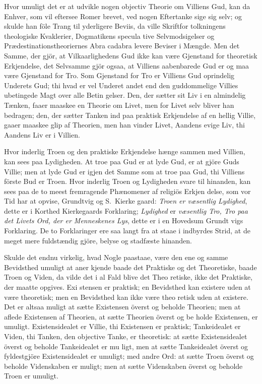 \documentclass[12pt,a4paper]{article}
\newcommand{\opage}[1]{\marginnote{\footnotesize\textit{[#1]}}}
\begin{document}
Hvor umuligt det er at udvikle nogen objectiv Theorie
om Villiens Gud, kan da Enhver, som vil eftersee Romer\-%
brevet, ved nogen Eftertanke sige sig selv; og skulde
han föle Trang til yderligere Beviis, da ville Skriftfor\-%
tolkningens theologiske Kvaklerier, Dogmatikens specula\-%
tive Selvmodsigelser og Prædestinationstheoriernes Abra\-%
cadabra levere Beviser i Mængde. Men det Samme, der
gjör, at Vilkaarlighedens Gud ikke kan være Gjenstand for
theoretisk Erkjendelse, det Selvsamme gjör ogsaa, at
Villiens aabenbarede Gud er og maa være Gjenstand for
Tro. Som Gjenstand for Tro er Villiens Gud oprindelig
Underets Gud; thi hvad er vel Underet andet end den
guddommelige Villies ubetingede Magt over alle Betin\-%
gelser. Den, der sætter sit Liv i en almindelig Tænken,
faaer maaskee en Theorie om Livet, men for Livet selv
bliver han bedragen; den, der sætter Tanken ind paa
praktisk Erkjendelse af en hellig Villie, gaaer maaskee
glip af Theorien, men han vinder Livet, Aandens evige
Liv, thi Aandens Liv er i Villien.

Hvor inderlig Troen og den praktiske Erkjendelse
hænge sammen med Villien, kan sees paa Lydigheden.
At troe paa Gud er at lyde Gud, er at gjöre Guds Villie;
men at lyde Gud er igjen det Samme som at troe paa
Gud, thi Villiens förste Bud er Troen. Hvor inderlig
Troen og Lydigheden svare til hinanden, kan sees paa
de to meest fremragende Phænomener af religiös Erkjen\-%
delse, som vor Tid har at opvise, Grundtvig og S.\ Kierke\-%
\opage{76}gaard: \emph{Troen er væsentlig Lydighed}, dette er
i Korthed Kierkegaards Forklaring; \emph{Lydighed} er
\emph{væsentlig Tro, Tro paa det Livets Ord, der er
Menneskenes Lys}, dette er i en Hovedsum Grundt\-%
vigs Forklaring. De to Forklaringer ere saa langt fra
at staae i indbyrdes Strid, at de meget mere fuldstændig\-%
gjöre, belyse og stadfæste hinanden.

Skulde det endnu virkelig, hvad Nogle paastaae,
være den ene og samme Bevidsthed umuligt at aner\-%
kjende baade det Praktiske og det Theoretiske, baade
Troen og Viden, da vilde det i al Fald blive det Theo\-%
retiske, ikke det Praktiske, der maatte opgives. Exi\-%
stensen er praktisk; en Bevidsthed kan existere uden at
være theoretisk; men en Bevidsthed kan ikke være theo\-%
retisk uden at existere. Det er altsaa muligt at sætte
Existensen överst og beholde Theorien; men at aflede
Existensen af Theorien, at sætte Theorien överst og be\-%
holde Existensen, er umuligt. Existensidealet er Villie,
thi Existensen er praktisk; Tankeidealet er Viden, thi
Tanken, den objective Tanke, er theoretisk: at sætte
Existensidealet överst og beholde Tankeidealet er mu\-%
ligt, men at sætte Tankeidealet överst og fyldestgjöre
Existensidealet er umuligt; med andre Ord: at sætte
Troen överst og beholde Videnskaben er muligt; men
at sætte Videnskaben överst og beholde Troen er umuligt.
\end{document}
